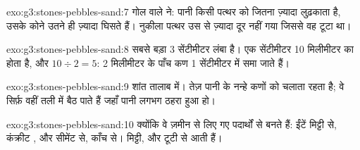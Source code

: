 \begin{solution}{exo:g3:stones-pebbles-sand:7}
गोल वाले ने: पानी किसी पत्थर को जितना ज़्यादा लुढ़काता है, उसके कोने उतने ही
ज़्यादा घिसते हैं। नुकीला पत्थर उस  से ज़्यादा दूर नहीं गया जिससे वह टूटा था।
\end{solution}

\begin{solution}{exo:g3:stones-pebbles-sand:8}
सबसे बड़ा  3 सेंटीमीटर लंबा है। एक सेंटीमीटर 10 मिलीमीटर का होता है,
और $10 \div 2 = 5$: 2 मिलीमीटर के पाँच कण 1 सेंटीमीटर में समा जाते हैं।
\end{solution}

\begin{solution}{exo:g3:stones-pebbles-sand:9}
शांत तालाब में। तेज़ पानी  के नन्हे कणों को चलाता रहता है; वे सिर्फ़
वहीं तली में बैठ पाते हैं जहाँ पानी लगभग ठहरा हुआ हो।
\end{solution}

\begin{solution}{exo:g3:stones-pebbles-sand:10}
क्योंकि वे ज़मीन से लिए गए पदार्थों से बनते हैं: ईंटें मिट्टी से, कंक्रीट
,  और सीमेंट से, काँच  से। मिट्टी,  और  टूटी  से
आती हैं।
\end{solution}
